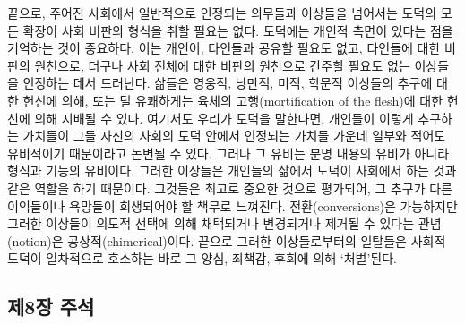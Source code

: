 끝으로, 주어진 사회에서 일반적으로 인정되는 의무들과 이상들을 넘어서는
도덕의 모든 확장이 사회 비판의 형식을 취할 필요는 없다. 도덕에는 개인적
측면이 있다는 점을 기억하는 것이 중요하다. 이는 개인이, 타인들과 공유할
필요도 없고, 타인들에 대한 비판의 원천으로, 더구나 사회 전체에 대한
비판의 원천으로 간주할 필요도 없는 이상들을 인정하는 데서 드러난다.
삶들은 영웅적, 낭만적, 미적, 학문적 이상들의 추구에 대한 헌신에 의해,
또는 덜 유쾌하게는 육체의 고행(mortification of the flesh)에 대한 헌신에
의해 지배될 수 있다. 여기서도 우리가 도덕을 말한다면, 개인들이 이렇게
추구하는 가치들이 그들 자신의 사회의 도덕 안에서 인정되는 가치들 가운데
일부와 적어도 유비적이기 때문이라고 논변될 수 있다. 그러나 그 유비는
분명 내용의 유비가 아니라 형식과 기능의 유비이다. 그러한 이상들은
개인들의 삶에서 도덕이 사회에서 하는 것과 같은 역할을 하기 때문이다.
그것들은 최고로 중요한 것으로 평가되어, 그 추구가 다른 이익들이나
욕망들이 희생되어야 할 책무로 느껴진다. 전환(conversions)은 가능하지만
그러한 이상들이 의도적 선택에 의해 채택되거나 변경되거나 제거될 수
있다는 관념(notion)은 공상적(chimerical)이다. 끝으로 그러한
이상들로부터의 일탈들은 사회적 도덕이 일차적으로 호소하는 바로 그 양심,
죄책감, 후회에 의해 ‘처벌’된다.

\newpage

\subsection{제8장 주석}\label{uxc81c8uxc7a5-uxc8fcuxc11d}


